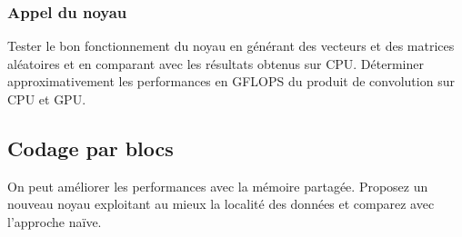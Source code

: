 \documentclass[a4paper]{article}
\begin{document}
\subsubsection{Appel du noyau}
Tester le bon fonctionnement du noyau en générant des vecteurs et des matrices aléatoires et en comparant avec les 
résultats obtenus sur CPU. Déterminer approximativement les performances en GFLOPS du produit de convolution sur CPU et GPU.
\subsection{Codage par blocs}
On peut améliorer les performances avec la mémoire partagée. Proposez un nouveau noyau exploitant au mieux la 
localité des données et comparez avec l'approche naïve.
\end{document}
